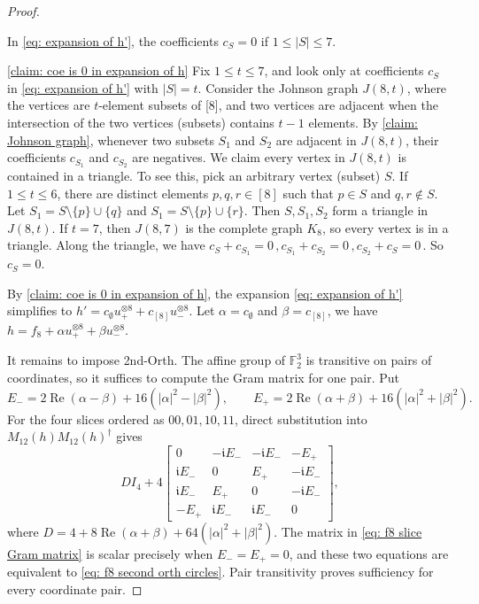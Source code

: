 \begin{proof}
\begin{claim}\label{claim: coe is 0 in expansion of h}
    In \eqref{eq: expansion of h'}, the coefficients $c_S=0$ if $1\le |S|\le 7$.
\end{claim}
\begin{claimproof}{\cref{claim: coe is 0 in expansion of h}}
    Fix \(1\le t\le 7\), and look only at coefficients \(c_S\) in \eqref{eq: expansion of h'} with $|S|=t$.
    Consider the Johnson graph $J(8,t)$, where the vertices are $t$-element subsets of [8], and two vertices are adjacent when the intersection of the two vertices (subsets) contains $t-1$ elements.
    By \cref{claim: Johnson graph}, whenever two subsets $S_1$ and $S_2$ are adjacent in $J(8,t)$, their coefficients $c_{S_1}$ and $c_{S_2}$ are negatives.
    We claim every vertex in $J(8,t)$ is contained in a triangle.
    To see this, pick an arbitrary vertex (subset) $S$.
    If $1\le t\le 6$, there are distinct elements $p,q,r\in [8]$ such that $p\in S$ and $q,r\notin S$.
    Let $S_1=S\setminus\{p\}\cup \{q\}$ and $S_1=S\setminus\{p\}\cup \{r\}$. 
    Then $S,S_1,S_2$ form a triangle in $J(8,t)$.
    If $t=7$, then $J(8,7)$ is the complete graph $K_8$, so every vertex is in a triangle.
    Along the triangle, we have $c_S+c_{S_1}=0\,,c_{S_1}+c_{S_2}=0\,,c_{S_2}+c_{S}=0\,$.
    So $c_S=0$.
\end{claimproof}
By \cref{claim: coe is 0 in expansion of h}, the expansion \eqref{eq: expansion of h'} simplifies to $h'=c_{\emptyset}u_+^{\otimes 8}+c_{[8]}u_-^{\otimes 8}.$
Let $\alpha=c_{\emptyset}$ and $\beta=c_{[8]}$, we have $h= f_8+\alpha u_+^{\otimes8}+\beta u_-^{\otimes8}.$

It remains to impose {\sc 2nd-Orth}.  The affine group of
$\mathbb F_2^3$ is transitive on pairs of coordinates, so it suffices to
compute the Gram matrix for one pair.  Put
\[
 E_-=2\operatorname{Re}(\alpha-\beta)
       +16(|\alpha|^2-|\beta|^2),\qquad
 E_+=2\operatorname{Re}(\alpha+\beta)
       +16(|\alpha|^2+|\beta|^2).
\]
For the four slices ordered as $00,01,10,11$, direct substitution into
$M_{12}(h)M_{12}(h)^\dagger$ gives
\begin{equation}
 D I_4+4
 \begin{bmatrix}
 0&-\mathfrak iE_-&-\mathfrak iE_-&-E_+\\
 \mathfrak iE_-&0&E_+&-\mathfrak iE_-\\
 \mathfrak iE_-&E_+&0&-\mathfrak iE_-\\
 -E_+&\mathfrak iE_-&\mathfrak iE_-&0
 \end{bmatrix},
 \label{eq: f8 slice Gram matrix}
\end{equation}
where
$D=4+8\operatorname{Re}(\alpha+\beta)
  +64(|\alpha|^2+|\beta|^2)$.
The matrix in \eqref{eq: f8 slice Gram matrix} is scalar precisely when
$E_-=E_+=0$, and these two equations are equivalent to
\eqref{eq: f8 second orth circles}.  Pair transitivity proves sufficiency
for every coordinate pair.
\end{proof}

